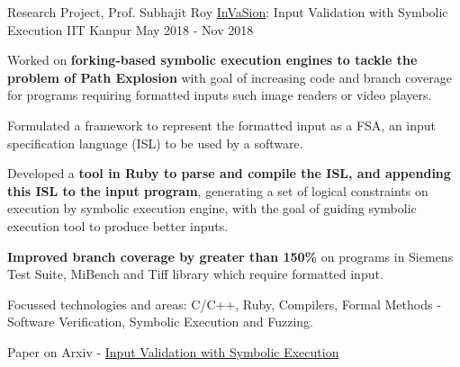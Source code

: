 \begin{cventries}


  \cventry
    {Research Project, Prof. Subhajit Roy} %
    {\href{https://arxiv.org/abs/2104.01438}{InVaSion}: Input Validation with Symbolic Execution} %
    {IIT Kanpur} %
    {May 2018 - Nov 2018} %
    {
      \begin{cvitems} %
      \item {Worked on \textbf{forking-based symbolic execution engines to tackle the problem of Path Explosion} with goal of increasing code and branch coverage for programs requiring formatted inputs such image readers or video players.}
      \item {Formulated a framework to represent the formatted input as a FSA, an input specification language (ISL) to be used by a software.}
        \item {Developed a \textbf{tool in Ruby to parse and compile the ISL, and appending this ISL to the input program}, generating a set of logical constraints on execution by symbolic execution engine, with the goal of guiding symbolic execution tool to produce better inputs.}
        \item {\textbf{Improved branch coverage by greater than 150\%} on programs in Siemens Test Suite, MiBench and Tiff library which require formatted input.}
        \item {Focussed technologies and areas: C/C++, Ruby, Compilers, Formal Methods - Software Verification, Symbolic Execution and Fuzzing.}
        \item {Paper on Arxiv - \href{https://arxiv.org/abs/2104.01438}{Input Validation with Symbolic Execution}}
      \end{cvitems}
    }%





\end{cventries}
